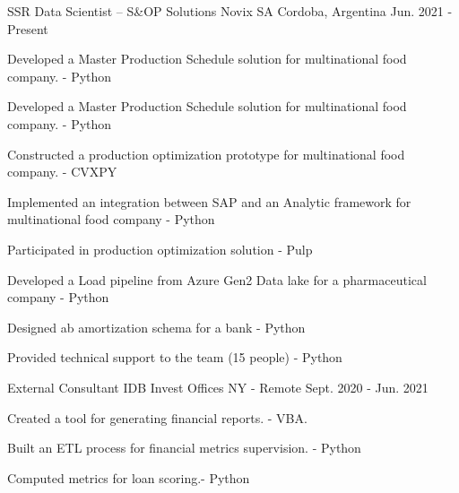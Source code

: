 

\begin{cventries}

  \cventry
    {SSR Data Scientist -- S\&OP Solutions} %
    {Novix SA} %
    {Cordoba, Argentina} %
    {Jun. 2021 - Present} %
    {
      \begin{cvitems} %
      \item {Developed a Master Production Schedule solution for multinational food company. - Python}
      \item {Developed a Master Production Schedule solution for multinational food company. - Python}
      \item {Constructed a production optimization prototype for multinational food company. - CVXPY}
      \item {Implemented an integration between SAP and an Analytic framework for multinational food company - Python}
      \item {Participated in production optimization solution - Pulp}
      \item {Developed a Load pipeline from Azure Gen2 Data lake for a pharmaceutical company - Python}      
      \item {Designed ab amortization schema for a bank - Python}      
      \item {Provided technical support to the team (15 people) - Python}
      \end{cvitems}
    }	
	
  \cventry
    {External Consultant} %
    {IDB Invest} %
    {Offices NY - Remote} %
    {Sept. 2020 - Jun. 2021} %
    {
      \begin{cvitems} %
      \item {Created a tool for generating financial reports. - VBA.}
      \item {Built an ETL process for financial metrics supervision. - Python}
      \item {Computed metrics for loan scoring.- Python}
      \end{cvitems}
    }


\end{cventries}
